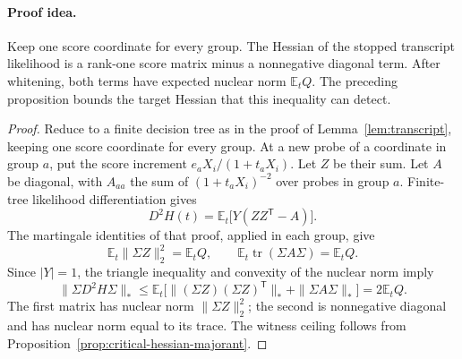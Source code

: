 \paragraph{Proof idea.}
Keep one score coordinate for every group. The Hessian of the stopped
transcript likelihood is a rank-one score matrix minus a nonnegative
diagonal term. After whitening, both terms have expected nuclear norm
$\mathbb E_tQ$. The preceding proposition bounds the target Hessian
that this inequality can detect.

\begin{proof}
Reduce to a finite decision tree as in the proof of
Lemma~\ref{lem:transcript}, keeping one score coordinate for every
group. At a new probe of a coordinate in group $a$, put the score
increment $e_aX_i/(1+t_aX_i)$. Let $Z$ be their sum. Let $A$ be
diagonal, with $A_{aa}$ the sum of $(1+t_aX_i)^{-2}$ over probes in
group $a$. Finite-tree likelihood differentiation gives
\[
 D^2H(t)=\mathbb E_t\bigl[Y(ZZ^{\mathsf T}-A)\bigr].
\]
The martingale identities of that proof, applied in each group, give
\[
 \mathbb E_t\|\Sigma Z\|_2^2=\mathbb E_tQ,
 \qquad
 \mathbb E_t\operatorname{tr}(\Sigma A\Sigma)=\mathbb E_tQ.
\]
Since $|Y|=1$, the triangle inequality and convexity of the nuclear
norm imply
\[
 \|\Sigma D^2H\Sigma\|_*
 \le\mathbb E_t\bigl[
       \|(\Sigma Z)(\Sigma Z)^{\mathsf T}\|_*
          +\|\Sigma A\Sigma\|_*\bigr]
 =2\mathbb E_tQ.
\]
The first matrix has nuclear norm $\|\Sigma Z\|_2^2$; the
second is nonnegative diagonal and has nuclear norm equal to its
trace. The witness ceiling follows from
Proposition~\ref{prop:critical-hessian-majorant}.
\end{proof}
